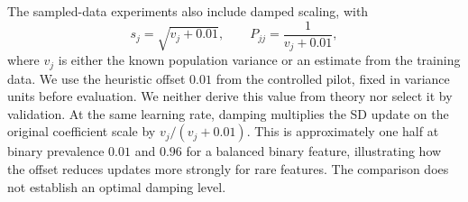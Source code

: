 The sampled-data experiments also include damped scaling, with
\begin{equation}
  s_j = \sqrt{v_j + 0.01},\qquad P_{jj}
      = \frac{1}{v_j + 0.01}, \label{eq:conference-damped}
\end{equation}
where $v_j$ is either the known population variance or an estimate from the
training data. We use the heuristic offset $0.01$ from the controlled pilot,
fixed in variance units before evaluation. We neither derive this value from
theory nor select it by validation. At the same learning rate, damping
multiplies the SD update on the original coefficient scale by
$v_j/(v_j + 0.01)$. This is approximately one half at binary prevalence $0.01$
and $0.96$ for a balanced binary feature, illustrating how the offset reduces
updates more strongly for rare features. The comparison does not establish an
optimal damping level.
